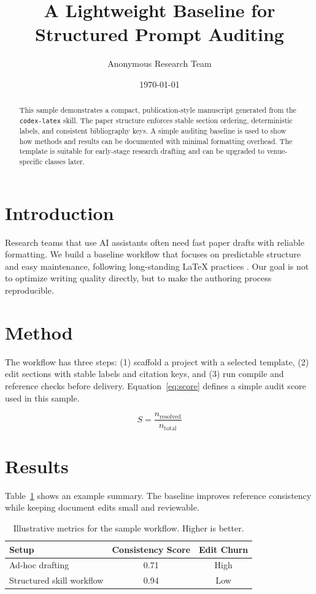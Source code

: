 \documentclass[11pt]{article}
\title{A Lightweight Baseline for Structured Prompt Auditing}
\author{Anonymous Research Team}
\date{\today}
\begin{document}
\maketitle

\begin{abstract}
This sample demonstrates a compact, publication-style manuscript generated from the \texttt{codex-latex} skill.
The paper structure enforces stable section ordering, deterministic labels, and consistent bibliography keys.
A simple auditing baseline is used to show how methods and results can be documented with minimal formatting overhead.
The template is suitable for early-stage research drafting and can be upgraded to venue-specific classes later.
\end{abstract}

\section{Introduction}
Research teams that use AI assistants often need fast paper drafts with reliable formatting.
We build a baseline workflow that focuses on predictable structure and easy maintenance, following long-standing LaTeX practices \citep{lamport1994}.
Our goal is not to optimize writing quality directly, but to make the authoring process reproducible.

\section{Method}
The workflow has three steps: (1) scaffold a project with a selected template, (2) edit sections with stable labels and citation keys, and (3) run compile and reference checks before delivery.
Equation~\eqref{eq:score} defines a simple audit score used in this sample.

\begin{equation}
\label{eq:score}
S = \frac{n_{\text{resolved}}}{n_{\text{total}}}
\end{equation}

\section{Results}
Table~\ref{tab:results} shows an example summary.
The baseline improves reference consistency while keeping document edits small and reviewable.

\begin{table}[t]
  \centering
  \caption{Illustrative metrics for the sample workflow. Higher is better.}
  \label{tab:results}
  \begin{tabular}{lcc}
    \toprule
    Setup & Consistency Score & Edit Churn \\
    \midrule
    Ad-hoc drafting & 0.71 & High \\
    Structured skill workflow & 0.94 & Low \\
    \bottomrule
  \end{tabular}
\end{table}
\end{document}

